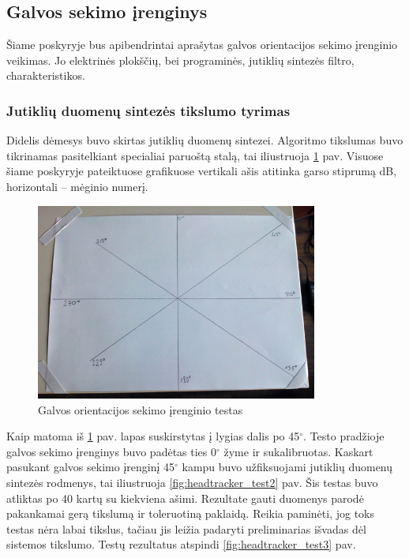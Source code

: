 \documentclass[]{vgtuef}
\begin{document}
\subsection{Galvos sekimo įrenginys}

Šiame poskyryje bus apibendrintai aprašytas galvos orientacijos sekimo įrenginio veikimas. Jo elektrinės plokščių, bei programinės, jutiklių sintezės filtro, charakteristikos.

\subsubsection{Jutiklių duomenų sintezės tikslumo tyrimas}

Didelis dėmesys buvo skirtas jutiklių duomenų sintezei. Algoritmo tikslumas buvo tikrinamas pasitelkiant specialiai paruoštą stalą, tai iliustruoja \ref{fig:headtracker_test1} pav. Visuose šiame poskyryje pateiktuose grafikuose vertikali ašis atitinka garso stiprumą dB, horizontali -- mėginio numerį.

\begin{figure}[htbp]
  \centering
  \includegraphics[width=350px]{img/head_tracker_testu_stalas.png}
  \caption{Galvos orientacijos sekimo įrenginio testas}
  \label{fig:headtracker_test1}
\end{figure}

Kaip matoma iš \ref{fig:headtracker_test1} pav. lapas suskirstytas į lygias dalis po 45$^\circ$. Testo pradžioje galvos sekimo įrenginys buvo padėtas ties 0$^\circ$ žyme ir sukalibruotas. Kaskart pasukant galvos sekimo įrenginį 45$^\circ$ kampu buvo užfiksuojami jutiklių duomenų sintezės rodmenys, tai iliustruoja \ref{fig:headtracker_test2} pav. Šis testas buvo atliktas po 40 kartų su kiekviena ašimi. Rezultate gauti duomenys parodė pakankamai gerą tikslumą ir toleruotiną paklaidą. Reikia paminėti, jog toks testas nėra labai tikslus, tačiau jis leižia padaryti preliminarias išvadas dėl sistemos tikslumo. Testų rezultatus atspindi \ref{fig:headtracker_test3} pav. 
\end{document}
